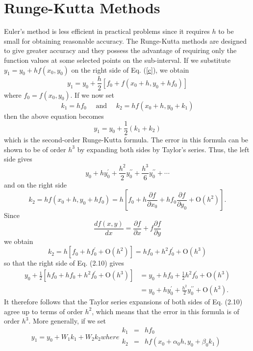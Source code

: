 \documentclass[12pt,a4paper,oneside]{book}
\begin{document}
\section{Runge-Kutta Methods}
Euler's method is less efficient in practical problems since it requires $h$ to be small for obtaining reasonable accuracy. The Runge-Kutta methods are designed to give greater accuracy and they possess the advantage of requiring only the function values at some selected points on the sub-interval. If we substitute $y_1=y_0+h f\left(x_0, y_0\right)$ on the right side of Eq. (\ref{c}), we obtain
$$
y_1=y_0+\frac{h}{2}\left[f_0+f\left(x_0+h, y_0+h f_0\right)\right]
$$
where $f_0=f\left(x_0, y_0\right)$. If we now set
$$
k_1=h f_0 \quad \text { and } \quad k_2=h f\left(x_0+h, y_0+k_1\right)
$$
then the above equation becomes
\begin{equation}\label{d}
	y_1=y_0+\frac{1}{2}\left(k_1+k_2\right)
\end{equation}
which is the second-order Runge-Kutta formula. The error in this formula can be shown to be of order $h^3$ by expanding both sides by Taylor's series. Thus, the left side gives
$$
y_0+h y_0^{\prime}+\frac{h^2}{2} y_0^{\prime \prime}+\frac{h^3}{6} y_0^{\prime \prime}+\cdots
$$
and on the right side
$$
k_2=h f\left(x_0+h, y_0+h f_0\right)=h\left[f_0+h \frac{\partial f}{\partial x_0}+h f_0 \frac{\partial f}{\partial y_0}+\mathrm{O}\left(h^2\right)\right] .
$$
Since
$$
\frac{d f(x, y)}{d x}=\frac{\partial f}{\partial x}+f \frac{\partial f}{\partial y}
$$
we obtain
$$
k_2=h\left[f_0+h f_0^{\prime}+\mathrm{O}\left(h^2\right)\right]=h f_0+h^2 f_0^{\prime}+\mathrm{O}\left(h^3\right)
$$
so that the right side of Eq. (2.10) gives
$$
\begin{aligned}
	y_0+\frac{1}{2}\left[h f_0+h f_0+h^2 f_0^{\prime}+\mathrm{O}\left(h^3\right)\right] & =y_0+h f_0+\frac{1}{2} h^2 f_0^{\prime}+\mathrm{O}\left(h^3\right) \\
	& =y_0+h y_0^{\prime}+\frac{h^2}{2} y_0^{\prime \prime}+\mathrm{O}\left(h^3\right) .
\end{aligned}
$$
It therefore follows that the Taylor series expansions of both sides of Eq. (2.10) agree up to terms of order $h^2$, which means that the error in this formula is of order $h^3$.
More generally, if we set
\begin{subequations}
	\begin{equation}
		y_1=y_0+W_1 k_1+W_2 k_2
	\end{equation}
	where
	\begin{eqnarray}
		k_1&=&h f_0 \\
		k_2&=&h f\left(x_0+\alpha_0 h, y_0+\beta_0 k_1\right)
	\end{eqnarray}
\end{subequations}
\end{document}
